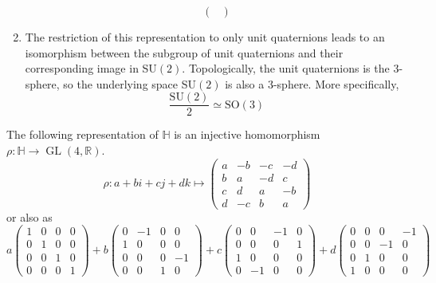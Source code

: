 \documentclass{article}
\DeclareMathOperator{\GL}{GL}
\begin{document}
\begin{proposition}
\begin{enumerate}
\begin{equation}
\begin{pmatrix}
              \end{pmatrix}
            \end{equation}
          \item The restriction of this representation to only unit quaternions leads to an isomorphism between the subgroup of unit quaternions and their corresponding image in SU$(2)$. Topologically, the unit quaternions is the $3$-sphere, so the underlying space SU$(2)$ is also a $3$-sphere. More specifically, 
            \begin{equation}
              \frac{\text{SU}(2)}{2} \simeq \text{SO}(3)
            \end{equation}
        \end{enumerate}
      \end{proposition}

      \begin{proposition}
      The following representation of $\mathbb{H}$ is an injective homomorphism $\rho: \mathbb{H} \longrightarrow \GL(4, \mathbb{R})$. 
      \begin{equation}
        \rho: a+bi+cj+dk \mapsto \begin{pmatrix}
        a&-b&-c&-d \\
        b&a&-d&c\\
        c&d&a&-b\\
        d&-c&b&a
        \end{pmatrix}
      \end{equation}
      or also as
      \begin{equation}
        a \begin{pmatrix}
        1 &0 &0 &0 \\
        0& 1&0&0\\
        0&0&1&0\\
        0&0&0&1
        \end{pmatrix} + b \begin{pmatrix}
        0&-1&0&0\\1&0&0&0\\0&0&0&-1\\0&0&1&0
        \end{pmatrix} + c\begin{pmatrix}
        0&0&-1&0\\0&0&0&1\\1&0&0&0\\0&-1&0&0
        \end{pmatrix} + d \begin{pmatrix}
        0&0&0&-1\\0&0&-1&0\\0&1&0&0\\1&0&0&0

\end{pmatrix}
\end{equation}
\end{proposition}
\end{document}
